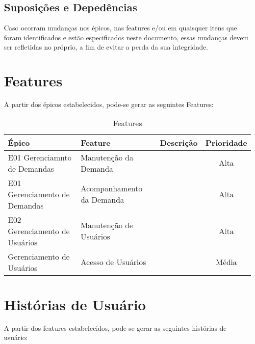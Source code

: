 \subsection{Suposições e Depedências}

Caso ocorram mudanças nos épicos, nas features e/ou em quaisquer itens que foram identificados e estão especificados neste documento, essas mudanças devem ser refletidas no próprio, a fim de evitar a perda da sua integridade.

\section{Features}

A partir dos épicos estabelecidos, pode-se gerar as seguintes Features:

\begin{table}[H]
	\begin{tabular}{|>{\centering}p{4cm}|>{\centering}p{4cm}|>{\centering}p{6cm}|c|}
		\hline 
		Épico & Feature & Descrição & Prioridade\tabularnewline
		\hline 
		\hline 
		E01 Gerenciamnto de Demandas & Manutenção da Demanda &  & Alta\tabularnewline
		\hline 
		E01 Gerenciamento de Demandas & Acompanhamento da Demanda &  & Alta\tabularnewline
		\hline 
		E02 Gerenciamento de Usuários & Manutenção de Usuários &  & Alta\tabularnewline
		\hline 
		Gerenciamento de Usuários & Acesso de Usuários &  & Média\tabularnewline
		\hline 
	\end{tabular}
	\caption{Features}
	\label{Features}
\end{table}

\section{Histórias de Usuário}

A partir dos features estabelecidos, pode-se gerar as seguintes histórias de usuário:


